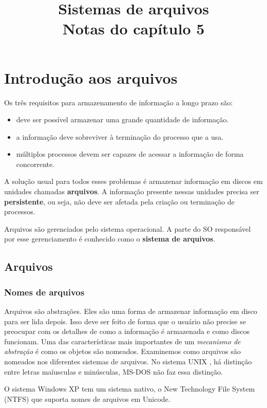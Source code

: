 \documentclass{article}
\title{Sistemas de arquivos \\ {\large \color{red}Notas do capítulo 5}}
\newcommand\unix{{\color{red}UNIX} }
\newcommand\msdos{{\color{yellow}MS-DOS} }
\newcommand\winxp{{\color{blue}Windows XP} }
\begin{document}
\maketitle

\section{Introdução aos arquivos}
Os três requisitos para armazenamento de informação a longo prazo são:

\begin{itemize}
  \item deve ser possível armazenar uma grande quantidade de informação.
  \item a informação deve sobreviver à terminação do processo que a usa. 
  \item múltiplos processos devem ser capazes de acessar a informação de forma concorrente.
\end{itemize}

A solução usual para todos esses problemas é armazenar informação em discos em unidades chamadas \textbf{arquivos}. A informação presente nessas unidades precisa ser \textbf{persistente}, ou seja, não deve ser afetada pela criação ou terminação de processos.

Arquivos são gerenciados pelo sistema operacional. A parte do SO responsável por esse gerenciamento é conhecido como o \textbf{sistema de arquivos}.

\subsection{Arquivos}

\subsubsection{Nomes de arquivos}
Arquivos são abstrações. Eles são uma forma de armazenar informação em disco para ser lida depois. Isso deve ser feito de forma que o usuário não precise se preocupar com os detalhes de como a informação é armazenada e como discos funcionam. Uma das características mais importantes de um \textit{mecanismo de abstração} é como os objetos são nomeados. Examinemos como arquivos são nomeados nos diferentes sistemas de arquivos.
No sistema \unix, há distinção entre letras maíusculas e minúsculas, \msdos não faz essa distinção.

O sistema \winxp tem um sistema nativo, o New Technology File System (NTFS) que suporta nomes de arquivos em Unicode. 
\end{document}
